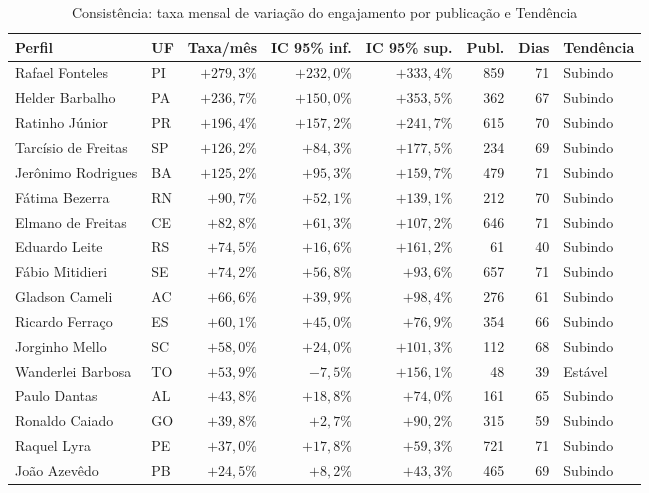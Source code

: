 \begin{table}[htb]
\centering
\caption{Consistência: taxa mensal de variação do engajamento por publicação e Tendência}
\label{tab:consistencia}
\scriptsize\setlength{\tabcolsep}{3pt}
\begin{tabular}{llrrrrrl}
\toprule
\textbf{Perfil} & \textbf{UF} & \textbf{Taxa/mês} & \textbf{IC 95\% inf.} & \textbf{IC 95\% sup.} & \textbf{Publ.} & \textbf{Dias} & \textbf{Tendência} \\
\midrule
Rafael Fonteles & PI & $+279{,}3\%$ & $+232{,}0\%$ & $+333{,}4\%$ & 859 & 71 & Subindo \\
Helder Barbalho & PA & $+236{,}7\%$ & $+150{,}0\%$ & $+353{,}5\%$ & 362 & 67 & Subindo \\
Ratinho Júnior & PR & $+196{,}4\%$ & $+157{,}2\%$ & $+241{,}7\%$ & 615 & 70 & Subindo \\
Tarcísio de Freitas & SP & $+126{,}2\%$ & $+84{,}3\%$ & $+177{,}5\%$ & 234 & 69 & Subindo \\
Jerônimo Rodrigues & BA & $+125{,}2\%$ & $+95{,}3\%$ & $+159{,}7\%$ & 479 & 71 & Subindo \\
Fátima Bezerra & RN & $+90{,}7\%$ & $+52{,}1\%$ & $+139{,}1\%$ & 212 & 70 & Subindo \\
Elmano de Freitas & CE & $+82{,}8\%$ & $+61{,}3\%$ & $+107{,}2\%$ & 646 & 71 & Subindo \\
Eduardo Leite & RS & $+74{,}5\%$ & $+16{,}6\%$ & $+161{,}2\%$ & 61 & 40 & Subindo \\
Fábio Mitidieri & SE & $+74{,}2\%$ & $+56{,}8\%$ & $+93{,}6\%$ & 657 & 71 & Subindo \\
Gladson Cameli & AC & $+66{,}6\%$ & $+39{,}9\%$ & $+98{,}4\%$ & 276 & 61 & Subindo \\
Ricardo Ferraço & ES & $+60{,}1\%$ & $+45{,}0\%$ & $+76{,}9\%$ & 354 & 66 & Subindo \\
Jorginho Mello & SC & $+58{,}0\%$ & $+24{,}0\%$ & $+101{,}3\%$ & 112 & 68 & Subindo \\
Wanderlei Barbosa & TO & $+53{,}9\%$ & $-7{,}5\%$ & $+156{,}1\%$ & 48 & 39 & Estável \\
Paulo Dantas & AL & $+43{,}8\%$ & $+18{,}8\%$ & $+74{,}0\%$ & 161 & 65 & Subindo \\
Ronaldo Caiado & GO & $+39{,}8\%$ & $+2{,}7\%$ & $+90{,}2\%$ & 315 & 59 & Subindo \\
Raquel Lyra & PE & $+37{,}0\%$ & $+17{,}8\%$ & $+59{,}3\%$ & 721 & 71 & Subindo \\
João Azevêdo & PB & $+24{,}5\%$ & $+8{,}2\%$ & $+43{,}3\%$ & 465 & 69 & Subindo \\

\end{tabular}
\end{table}
